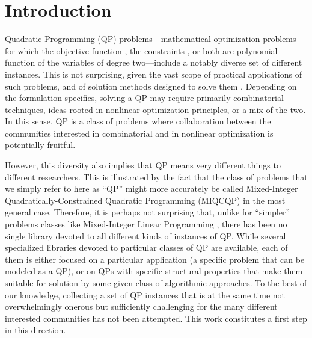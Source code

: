 
\section{Introduction}\label{sec:intro}

Quadratic Programming (QP) problems---mathematical optimization problems for which the objective function \cite{wiki:qp}, the constraints \cite{wiki:qcqp}, or both are polynomial function of the variables of degree two---include a notably diverse set of different instances. This is not surprising, given the vast scope of practical applications of such problems, and of solution methods designed to solve them \cite{GoulToin00a}. Depending on the formulation specifics, solving a QP may require primarily combinatorial techniques, ideas rooted in nonlinear optimization principles, or a mix of the two. In this sense, QP is a class of problems where collaboration between the communities interested in combinatorial and in nonlinear optimization is potentially fruitful.

However, this diversity also implies that QP means very different things to different researchers. This is illustrated by the fact that the class of problems that we simply refer to here as ``QP'' might more accurately be called Mixed-Integer Quadratically-Constrained Quadratic Programming (MIQCQP) in the most general case. Therefore, it is perhaps not surprising that, unlike for ``simpler'' problems classes like Mixed-Integer Linear Programming \cite{Koch2011},  there has been no single library devoted to all different kinds of instances of QP.
While several specialized libraries devoted to particular classes of QP are available, each of them is either focused on a particular application (a specific problem that can be modeled as a QP), or on QPs with specific structural properties that make them suitable for solution by some given class of algorithmic approaches. To the best of our knowledge, collecting a set of QP instances that is at the same time not overwhelmingly onerous but sufficiently challenging for the many different interested communities has not been attempted. This work constitutes a first step in this direction.

